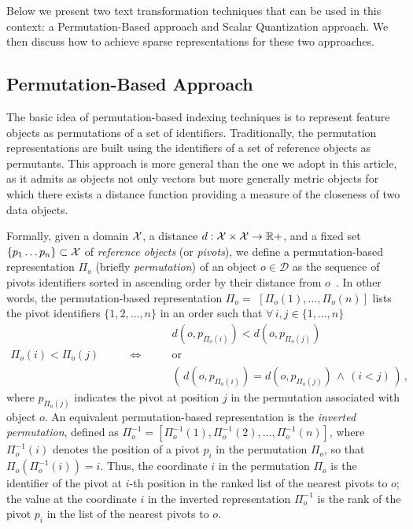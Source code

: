 Below we present two text transformation techniques that can be used in this context: a Permutation-Based approach and Scalar Quantization approach.
We then discuss how to achieve sparse representations for these two approaches.

\subsection{Permutation-Based Approach}
\label{subsec:str:deep-permutations}

The basic idea of permutation-based indexing techniques is to represent feature objects as permutations of a set of identifiers.
Traditionally, the permutation representations are built using the identifiers of a set of reference objects as permutants.
This approach is more general than the one we adopt in this article, as it admits as objects not only vectors but more generally metric objects for which there exists a distance function providing a measure of the closeness of two data objects.

Formally, given a domain $\mathcal{X}$, a distance $d:\mathcal{X}\times \mathcal{X}\to \mathbb{R}+$, and a fixed set  $\{p_1\ldots p_n\}\subset\mathcal{X}$ of \emph{reference objects} (or \emph{pivots}), we define a permutation-based representation $\Pi_{o}$ (briefly \emph{permutation}) of an object $o\in \mathcal{D}$ as the sequence of pivots identifiers sorted in ascending order by their distance from $o$~\cite{amato2014mi,amato2014some}.
In other words, the permutation-based representation $\Pi_{o}=$ $[\Pi_{o}(1), \ldots , \Pi_{o}(n)]$ lists the pivot identifiers $\{1, 2, \ldots, n\}$ in an order such that $\forall\, i,j \in \{1,\ldots, n\}$
\begin{equation}
\begin{matrix}
& & d(o,p_{\Pi_{o}(i)}) <    d(o,p_{\Pi_{o}(j)})\, \\
\Pi_{o}(i)< \Pi_{o}(j)\qquad &\Leftrightarrow\qquad & \text{or} \\
& &\left(\, d(o,p_{\Pi_{o}(i)}) =    d(o,p_{\Pi_{o}(j)})\, \wedge\, (i<j)\, \right) \,,
\end{matrix}
\end{equation}
where $p_{\Pi_o(j)}$ indicates the pivot at position $j$ in the permutation associated with object $o$.
An equivalent permutation-based representation is the \emph{inverted permutation}, defined as  $\Pi^{-1}_{o}=[\Pi_{o}^{-1}(1), \Pi_{o}^{-1}(2),\dots , \Pi_{o}^{-1}(n)]$, where $\Pi_{o}^{-1}(i)$ denotes the position of a pivot $p_i$ in the permutation $\Pi_{o}$, so that $\Pi_o(\Pi_o^{-1}(i))=i$.
Thus, the coordinate $i$ in the permutation $\Pi_{o}$ is the identifier of the pivot at $i$-th position in the ranked list of the nearest pivots to $o$;
the value at the coordinate $i$ in the inverted representation $\Pi^{-1}_{o}$ is the rank of the pivot $p_i$ in the list of the nearest pivots to $o$.

